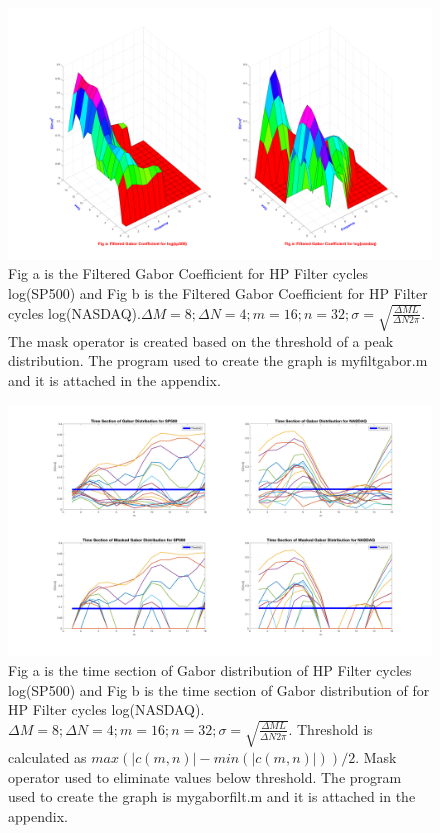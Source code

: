 \begin{figure}[!ht]
\includegraphics[scale=.15]{Images/GaborMasked16}
\caption{Fig a is the Filtered Gabor Coefficient for HP Filter cycles log(SP500) and Fig b is the Filtered Gabor Coefficient for HP Filter cycles log(NASDAQ).$\Delta M = 8; \Delta N = 4; m = 16 ;n = 32 ; \sigma = \sqrt{\frac{\Delta M L}{\Delta N 2\pi}}$. The mask operator is created based on the threshold of a peak distribution. The program used to create the graph is myfiltgabor.m and it is attached in the appendix.}
\label{fig:GaborMasked16}
\end{figure}

\begin{figure}[!ht]
\includegraphics[scale=.15]{Images/GaborPST16}
\caption{Fig a is the time section of Gabor distribution of HP Filter cycles log(SP500) and Fig b is the time section of Gabor distribution of for HP Filter cycles log(NASDAQ). $\Delta M = 8; \Delta N = 4; m = 16; n = 32; \sigma = \sqrt{\frac{\Delta M L}{\Delta N 2\pi}}$. Threshold is calculated as $max(|c(m,n)|-min(|c(m,n)|))/2$. Mask operator used to eliminate values below threshold. The program used to create the graph is mygaborfilt.m and it is attached in the appendix.}
\label{fig:GaborPST16}
\end{figure}


